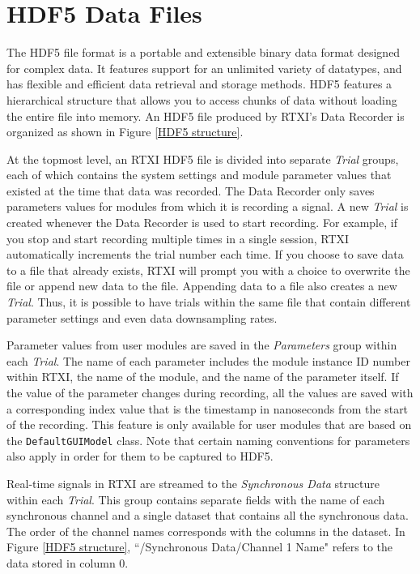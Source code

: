 \section{HDF5 Data Files}
\label{HDF5}
The HDF5 file format is a portable and extensible binary data format designed for complex data. It features support for an unlimited variety of datatypes, and has flexible and efficient data retrieval and storage methods. HDF5 features a hierarchical structure that allows you to access chunks of data without loading the entire file into memory. An HDF5 file produced by RTXI's Data Recorder is organized as shown in Figure \ref{HDF5 structure}. 

At the topmost level, an RTXI HDF5 file is divided into separate \emph{Trial} groups, each of which contains the system settings and module parameter values that existed at the time that data was recorded. The Data Recorder only saves \attention parameters values for modules from which it is recording a signal. A new \emph{Trial} is created whenever the Data Recorder is used to start recording. For example, if you stop and start recording multiple times in a single session, RTXI automatically increments the trial number each time. If you choose to save data to a file that already exists, RTXI will prompt you with a choice to overwrite the file or append new data to the file. Appending data to a file also creates a new \emph{Trial}. Thus, it is possible to have trials within the same file that contain different parameter settings and even data downsampling rates.

Parameter values from user modules are saved in the \emph{Parameters} group within each \emph{Trial}. The name of each parameter includes the module instance ID number within RTXI, the name of the module, and the name of the parameter itself. If the value of the parameter changes during recording, all the values are saved with a corresponding index value that is the timestamp in nanoseconds from the start of the recording. This feature is only available for user modules that are \attention based on the  \texttt{DefaultGUIModel} class. Note that certain naming conventions for parameters also apply in order for them to be captured to HDF5.

Real-time signals in RTXI are streamed to the \emph{Synchronous Data} structure within each \emph{Trial}. This group contains separate fields with the name of each synchronous channel and a single dataset that contains all the synchronous data. The order of the channel names corresponds with the columns in the dataset. In Figure \ref{HDF5 structure}, ``/Synchronous Data/Channel 1 Name" refers to the data stored in column 0.\clearpage

